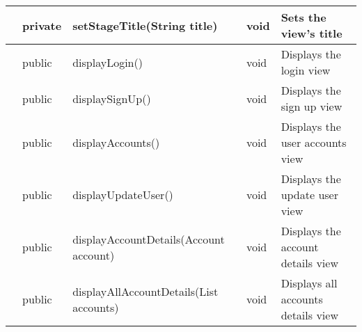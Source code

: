 \documentclass[12pt]{article}
\begin{document}
\begin{table}[H]
{\begin{tabular}{|l|l|l|l|l|}
                     & private             & setStageTitle(String title)                                   & void               & Sets the view's title                                                                                                          \\ \hline
                     & public              & displayLogin()                                                & void               & Displays the login view                                                                                                        \\ \hline
                     & public              & displaySignUp()                                               & void               & Displays the sign up view                                                                                                      \\ \hline
                     & public              & displayAccounts()                                             & void               & Displays the user accounts view                                                                                                \\ \hline
                     & public              & displayUpdateUser()                                           & void               & Displays the update user view                                                                                                  \\ \hline
                     & public              & displayAccountDetails(Account account)                        & void               & Displays the account details view                                                                                              \\ \hline
                     & public              & displayAllAccountDetails(List accounts)                       & void               & Displays all accounts details view                                                                                             \\ \hline
\end{tabular}%
}
\end{table}

\end{document}
